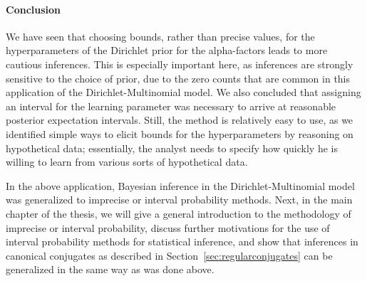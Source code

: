 \paragraph{Conclusion}

We have seen that choosing bounds, rather than precise values,
for the hyperparameters of the Dirichlet prior for the alpha-factors
leads to more cautious inferences.
This is especially important here,
as inferences are strongly sensitive to the choice of prior,
due to the zero counts that are common in this application of the Dirichlet-Multinomial model.
We also concluded that assigning an interval for the learning parameter was necessary
to arrive at reasonable posterior expectation intervals.
Still, the method is relatively easy to use, as
we identified simple ways to elicit bounds for the hyperparameters
by reasoning on hypothetical data;
essentially, the analyst needs to specify how quickly he is willing to learn
from various sorts of hypothetical data.

\medskip

In the above application, Bayesian inference in the Dirichlet-Multinomial model
was generalized to imprecise or interval probability methods.
Next, in the main chapter of the thesis,
we will give a general introduction to the methodology of imprecise or interval probability,
discuss further motivations for the use of interval probability methods for statistical inference,
and show that inferences in canonical conjugates as described in Section~\ref{sec:regularconjugates}
can be generalized in the same way as was done above.
